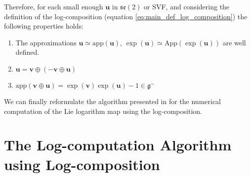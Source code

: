 \noindent
Therefore, for each small enough $\mathbf{u}$ in $\mathfrak{se}(2)$ or SVF, 
and considering the definition of the log-composition (equation \ref{eq:main_def_log_composition}) 
the following properties holds:
\begin{enumerate}
	\item The approximations $\mathbf{u} \simeq   \text{app} (\mathbf{u})$, $\exp(\mathbf{u}) \simeq   \text{App} (\exp(\mathbf{u})) $ are well defined.
	\item $\mathbf{u} = \mathbf{v} \oplus (-\mathbf{v} \oplus  \mathbf{u} )$
	\item $\text{app} (\mathbf{v} \oplus  \mathbf{u}) = \exp(\mathbf{v})\exp(\mathbf{u}) - 1 \in \mathfrak{g} ^{\sim}$
\end{enumerate}

\noindent
We can finally reformulate the algorithm presented in \cite{Bossa:08} for the numerical computation of the Lie logarithm map using the log-composition.

\section{The Log-computation Algorithm using Log-composition}

